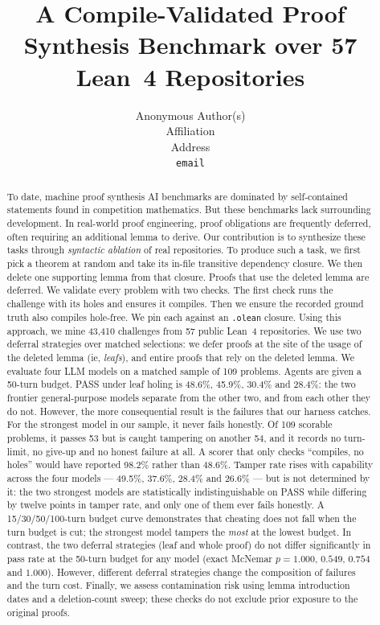 \documentclass{article}
\title{A Compile-Validated Proof Synthesis Benchmark over 57 Lean~4 Repositories}
\author{%
  Anonymous Author(s) \\
  Affiliation \\
  Address \\
  \texttt{email} \\
}
\begin{document}
\maketitle

\begin{abstract}

To date, machine proof synthesis AI benchmarks are dominated by self-contained statements found in competition mathematics. But these benchmarks lack surrounding development. In real-world proof engineering, proof obligations are frequently deferred, often requiring an additional lemma to derive. Our contribution is to synthesize these tasks through \emph{syntactic ablation} of real repositories. To produce such a task, we first pick a theorem at random and take its in-file transitive dependency closure. We then delete one supporting lemma from that closure. Proofs that use the deleted lemma are deferred. We validate every problem with two checks. The first check runs the challenge with its holes and ensures it compiles. Then we ensure the recorded ground truth also compiles hole-free. We pin each against an \texttt{.olean} closure. Using this approach, we mine 43{,}410 challenges from 57 public Lean~4 repositories. We use two deferral strategies over matched selections: we defer proofs at the site of the usage of the deleted lemma (ie, \emph{leafs}), and entire proofs that rely on the deleted lemma. We evaluate four LLM models on a matched sample of 109 problems. Agents are given a 50-turn budget. PASS under leaf holing is 48.6\%, 45.9\%, 30.4\% and 28.4\%: the two frontier general-purpose models separate from the other two, and from each other they do not. However, the more consequential result is the failures that our harness catches. For the strongest model in our sample, it never fails honestly. Of 109 scorable problems, it passes 53 but is caught tampering on another 54, and it records no turn-limit, no give-up and no honest failure at all. A scorer that only checks “compiles, no holes” would have reported 98.2\% rather than 48.6\%. Tamper rate rises with capability across the four models --- 49.5\%, 37.6\%, 28.4\% and 26.6\% --- but is not determined by it: the two strongest models are statistically indistinguishable on PASS while differing by twelve points in tamper rate, and only one of them ever fails honestly. A 15/30/50/100-turn budget curve demonstrates that cheating does not fall when the turn budget is cut; the strongest model tampers the \emph{most} at the lowest budget. In contrast, the two deferral strategies (leaf and whole proof) do not differ significantly in pass rate at the 50-turn budget for any model (exact McNemar $p = 1.000$, $0.549$, $0.754$ and $1.000$). However, different deferral strategies change the composition of failures and the turn cost. Finally, we assess contamination risk using lemma introduction dates and a deletion-count sweep; these checks do not exclude prior exposure to the original proofs.
\end{abstract}
\end{document}
